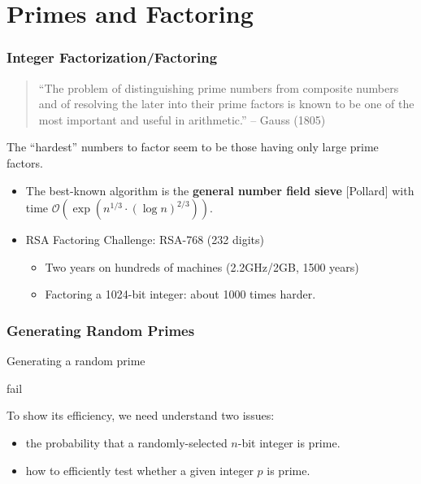 \section{Primes and Factoring}
\begin{frame}\frametitle{Integer Factorization/Factoring}

\begin{quote}
``The problem of distinguishing prime numbers from composite numbers and of resolving the later into their prime factors is known to be one of the most important and useful in arithmetic.'' -- Gauss (1805)
\end{quote}

The ``hardest'' numbers to factor seem to be those having only large prime factors.
\begin{itemize}
\item The best-known algorithm is the \textbf{general number field sieve} [Pollard] with time $\mathcal{O}(\exp(n^{1/3}\cdot(\log n)^{2/3}))$.
\item RSA Factoring Challenge: RSA-768 (232 digits)
\begin{itemize}
\item Two years on hundreds of machines (2.2GHz/2GB, 1500 years)
\item Factoring a 1024-bit integer: about 1000 times harder.
\end{itemize}
\end{itemize}
\end{frame}
\begin{frame}\frametitle{Generating Random Primes}
\begin{algorithm}[H]
\DontPrintSemicolon
\caption{Generating a random prime}
\BlankLine
{}
\Return fail
\end{algorithm}
To show its efficiency, we need understand two issues:
\begin{itemize}
\item the probability that a randomly-selected $n$-bit integer is prime.
\item how to efficiently test whether a given integer $p$ is prime.
\end{itemize}
\end{frame}

